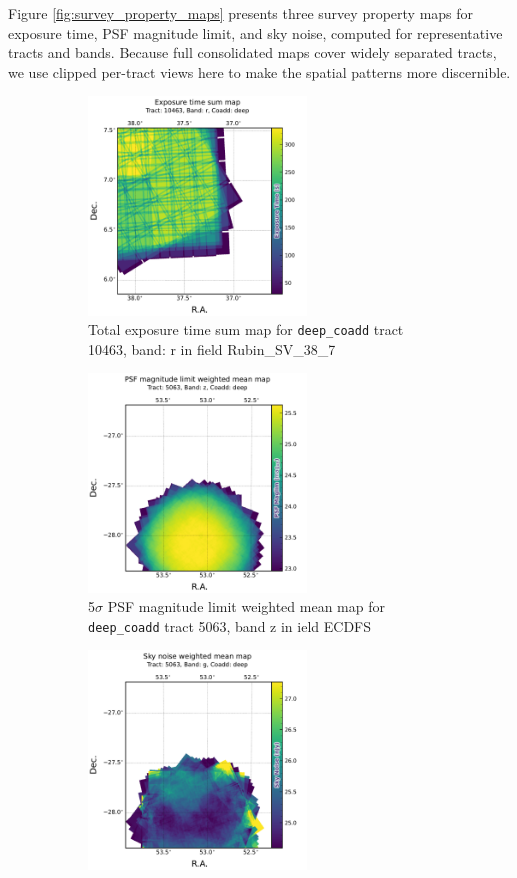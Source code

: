 Figure \ref{fig:survey_property_maps} presents three survey property maps for exposure time, PSF magnitude limit, and sky noise, computed for representative tracts and bands. 
Because full consolidated maps cover widely separated tracts, we use clipped per-tract views here to make the spatial patterns more discernible.
\begin{figure}[hbt!]
  \centering
  \begin{subfigure}[t]{0.31\textwidth}
  \includegraphics[width=\linewidth, height=5.8cm]{deepCoadd_exposure_time_map_sum_tract10463_rband.pdf}
  \caption{Total exposure time sum map for   \texttt{deep\_coadd} tract 10463, band: r in field Rubin\_SV\_38\_7}
  \end{subfigure}\hfill
  \begin{subfigure}[t]{0.31\textwidth}
  \includegraphics[width=\linewidth, height=5.8cm]{deepCoadd_psf_maglim_map_weighted_mean_tract5063_zband.pdf}
  \caption{5$\sigma$ PSF magnitude limit weighted mean map for \texttt{deep\_coadd} tract 5063, band z in ield ECDFS}
  \end{subfigure}\hfill
    \begin{subfigure}[t]{0.31\textwidth}
  \includegraphics[width=\linewidth, height=5.8cm]{deepCoadd_sky_noise_map_weighted_mean_tract5063_gband.pdf}

\end{subfigure}
\end{figure}
